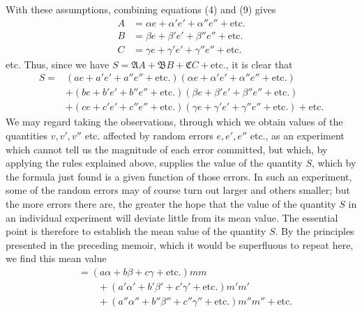 With these assumptions, combining equations (4) and (9) gives
\[
\begin{aligned}
A&=\alpha e+\alpha'e'+\alpha''e''+\text{etc.}\\
B&=\beta e+\beta'e'+\beta''e''+\text{etc.}\\
C&=\gamma e+\gamma'e'+\gamma''e''+\text{etc.}
\end{aligned}
\]
etc. Thus, since we have \(S=\mathfrak A A+\mathfrak B B+\mathfrak C C+\text{etc.}\), it is clear that
\[
\begin{aligned}
S={}&(ae+a'e'+a''e''+\text{etc.})(\alpha e+\alpha'e'+\alpha''e''+\text{etc.})\\
&+(be+b'e'+b''e''+\text{etc.})(\beta e+\beta'e'+\beta''e''+\text{etc.})\\
&+(ce+c'e'+c''e''+\text{etc.})(\gamma e+\gamma'e'+\gamma''e''+\text{etc.})+\text{etc.}
\end{aligned}
\]
We may regard taking the observations, through which we obtain values of the quantities \(v,v',v''\) etc. affected by random errors \(e,e',e''\) etc., as
an experiment which cannot tell us the magnitude of each error committed, but which, by applying the rules explained above, supplies the value of the quantity \(S\), which by the formula just found is a given function of those errors. In such an experiment, some of the random errors may of course turn out larger and others smaller; but the more errors there are, the greater the hope that the value of the quantity \(S\) in an individual experiment will deviate little from its mean value. The essential point is therefore to establish the mean value of the quantity \(S\). By the principles presented in the preceding memoir, which it would be superfluous to repeat here, we find this mean value
\[
\begin{aligned}
&=(a\alpha+b\beta+c\gamma+\text{etc.})mm\\&\qquad+(a'\alpha'+b'\beta'+c'\gamma'+\text{etc.})m'm'\\
&\qquad+(a''\alpha''+b''\beta''+c''\gamma''+\text{etc.})m''m''+\text{etc.}
\end{aligned}
\]

